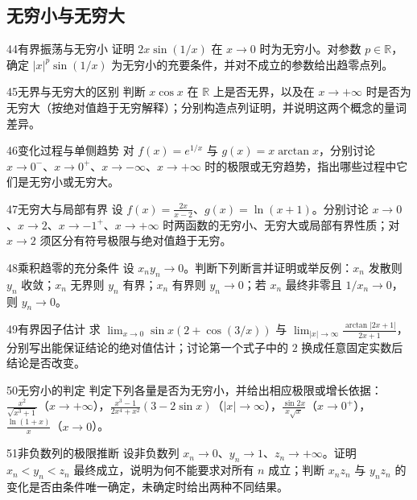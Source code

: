 \subsection{无穷小与无穷大}
\begin{exercise}{44}{有界振荡与无穷小}
证明 $2x\sin(1/x)$ 在 $x\to0$ 时为无穷小。对参数 $p\in\mathbb R$，确定 $|x|^p\sin(1/x)$ 为无穷小的充要条件，并对不成立的参数给出趋零点列。
\end{exercise}
\begin{exercise}{45}{无界与无穷大的区别}
判断 $x\cos x$ 在 $\mathbb R$ 上是否无界，以及在 $x\to+\infty$ 时是否为无穷大（按绝对值趋于无穷解释）；分别构造点列证明，并说明这两个概念的量词差异。
\end{exercise}
\begin{exercise}{46}{变化过程与单侧趋势}
对 $f(x)=e^{1/x}$ 与 $g(x)=x\arctan x$，分别讨论 $x\to0^-$、$x\to0^+$、$x\to-\infty$、$x\to+\infty$ 时的极限或无穷趋势，指出哪些过程中它们是无穷小或无穷大。
\end{exercise}
\begin{exercise}{47}{无穷大与局部有界}
设 $f(x)=\frac{2x}{x-2}$、$g(x)=\ln(x+1)$。分别讨论 $x\to0$、$x\to2$、$x\to-1^+$、$x\to+\infty$ 时两函数的无穷小、无穷大或局部有界性质；对 $x\to2$ 须区分有符号极限与绝对值趋于无穷。
\end{exercise}
\begin{exercise}{48}{乘积趋零的充分条件}
设 $x_ny_n\to0$。判断下列断言并证明或举反例：$x_n$ 发散则 $y_n$ 收敛；$x_n$ 无界则 $y_n$ 有界；$x_n$ 有界则 $y_n\to0$；若 $x_n$ 最终非零且 $1/x_n\to0$，则 $y_n\to0$。
\end{exercise}
\begin{exercise}{49}{有界因子估计}
求 $\lim_{x\to0}\sin x(2+\cos(3/x))$ 与 $\lim_{|x|\to\infty}\frac{\arctan|2x+1|}{2x+1}$，分别写出能保证结论的绝对值估计；讨论第一个式子中的 $2$ 换成任意固定实数后结论是否改变。
\end{exercise}
\begin{exercise}{50}{无穷小的判定}
判定下列各量是否为无穷小，并给出相应极限或增长依据：$\frac{x^2}{\sqrt{x^3+1}}$（$x\to+\infty$），$\frac{x^3-1}{2x^4+x^2}(3-2\sin x)$（$|x|\to\infty$），$\frac{\sin2x}{x\sqrt x}$（$x\to0^+$），$\frac{\ln(1+x)}x$（$x\to0$）。
\end{exercise}
\begin{exercise}{51}{非负数列的极限推断}
设非负数列 $x_n\to0$、$y_n\to1$、$z_n\to+\infty$。证明 $x_n<y_n<z_n$ 最终成立，说明为何不能要求对所有 $n$ 成立；判断 $x_nz_n$ 与 $y_nz_n$ 的变化是否由条件唯一确定，未确定时给出两种不同结果。
\end{exercise}
